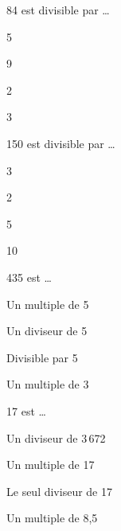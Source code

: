 

\begin{QCM}
  \begin{GroupeQCM} 
    \begin{exercice}
      84 est divisible par \ldots
      \begin{ChoixQCM}{4}
      \item 5
      \item 9
      \item 2
      \item3
      \end{ChoixQCM}
\begin{corrige}
   \end{corrige}
    \end{exercice}

    \begin{exercice}
      150 est divisible par \ldots
      \begin{ChoixQCM}{4}
      \item 3
      \item 2
      \item 5
      \item 10
      \end{ChoixQCM}
\begin{corrige}
   \end{corrige}
    \end{exercice}
    
    \begin{exercice}
      435 est \ldots
      \begin{ChoixQCM}{4}
      \item Un multiple de 5
      \item Un diviseur de 5
      \item Divisible par 5
      \item Un multiple de 3
      \end{ChoixQCM}
\begin{corrige}
   \end{corrige}
    \end{exercice}

    \begin{exercice}
      17 est \ldots
      \begin{ChoixQCM}{4}
      \item Un diviseur de 3\,672
      \item Un multiple de 17
      \item Le seul diviseur de 17
      \item Un multiple de 8,5
      \end{ChoixQCM}
\begin{corrige}
   \end{corrige}
    \end{exercice}


\end{GroupeQCM}
\end{QCM}
